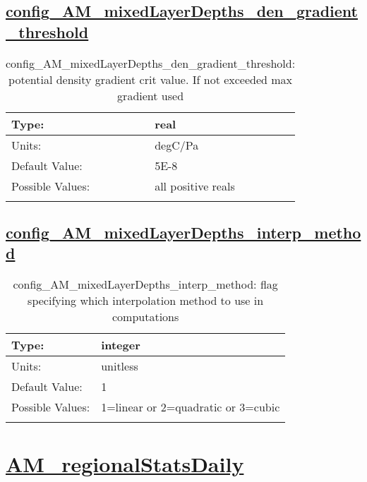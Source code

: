 \subsection[config\_AM\_mixedLayerDepths\_den\_gradient\_threshold]{\hyperref[sec:nm_tab_AM_mixedLayerDepths]{config\_AM\_mixedLayerDepths\_den\_gradient\_threshold}}
\label{subsec:nm_sec_config_AM_mixedLayerDepths_den_gradient_threshold}
\begin{center}
\begin{longtable}{| p{2.0in} || p{4.0in} |}
    \hline
    Type: & real \\
    \hline
    Units: & \si{degC/Pa} \\
    \hline
    Default Value: & 5E-8 \\
    \hline
    Possible Values: & all positive reals \\
    \hline
    \caption{config\_AM\_mixedLayerDepths\_den\_gradient\_threshold: potential density gradient crit value.  If not exceeded max gradient used}
\end{longtable}
\end{center}
\subsection[config\_AM\_mixedLayerDepths\_interp\_method]{\hyperref[sec:nm_tab_AM_mixedLayerDepths]{config\_AM\_mixedLayerDepths\_interp\_method}}
\label{subsec:nm_sec_config_AM_mixedLayerDepths_interp_method}
\begin{center}
\begin{longtable}{| p{2.0in} || p{4.0in} |}
    \hline
    Type: & integer \\
    \hline
    Units: & \si{unitless} \\
    \hline
    Default Value: & 1 \\
    \hline
    Possible Values: & 1=linear or 2=quadratic or 3=cubic \\
    \hline
    \caption{config\_AM\_mixedLayerDepths\_interp\_method: flag specifying which interpolation method to use in computations}
\end{longtable}
\end{center}
\section[AM\_regionalStatsDaily]{\hyperref[sec:nm_tab_AM_regionalStatsDaily]{AM\_regionalStatsDaily}}
\label{sec:nm_sec_AM_regionalStatsDaily}
